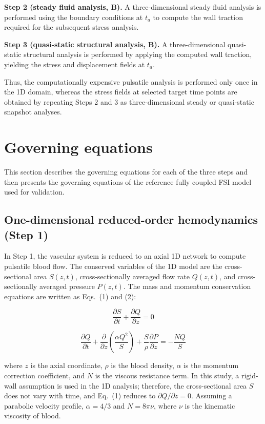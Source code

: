 \documentclass[master,english,final]{kaist-ucs}
\begin{document}
\textbf{Step 2 (steady fluid analysis, B).} A three-dimensional steady fluid analysis is performed using the boundary conditions at $t_a$ to compute the wall traction required for the subsequent stress analysis.

\textbf{Step 3 (quasi-static structural analysis, B).} A three-dimensional quasi-static structural analysis is performed by applying the computed wall traction, yielding the stress and displacement fields at $t_a$.

Thus, the computationally expensive pulsatile analysis is performed only once in the 1D domain, whereas the stress fields at selected target time points are obtained by repeating Steps 2 and 3 as three-dimensional steady or quasi-static snapshot analyses.

\section{Governing equations}
This section describes the governing equations for each of the three steps and then presents the governing equations of the reference fully coupled FSI model used for validation.

\subsection{One-dimensional reduced-order hemodynamics (Step 1)}
In Step 1, the vascular system is reduced to an axial 1D network to compute pulsatile blood flow. The conserved variables of the 1D model are the cross-sectional area $S(z,t)$, cross-sectionally averaged flow rate $Q(z,t)$, and cross-sectionally averaged pressure $P(z,t)$. The mass and momentum conservation equations are written as Eqs.~(1) and (2):

\begin{equation}
\frac{\partial S}{\partial t} + \frac{\partial Q}{\partial z} = 0
\end{equation}

\begin{equation}
\frac{\partial Q}{\partial t} + \frac{\partial}{\partial z}\!\left(\frac{\alpha Q^2}{S}\right) + \frac{S}{\rho}\frac{\partial P}{\partial z} = -\frac{NQ}{S}
\end{equation}

where $z$ is the axial coordinate, $\rho$ is the blood density, $\alpha$ is the momentum correction coefficient, and $N$ is the viscous resistance term. In this study, a rigid-wall assumption is used in the 1D analysis; therefore, the cross-sectional area $S$ does not vary with time, and Eq.~(1) reduces to $\partial Q/\partial z = 0$. Assuming a parabolic velocity profile, $\alpha = 4/3$ and $N = 8\pi\nu$, where $\nu$ is the kinematic viscosity of blood.
\end{document}
